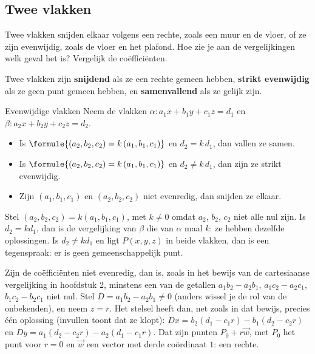 \subsection{Twee vlakken}

Twee vlakken snijden elkaar volgens een rechte, zoals een muur en de vloer, of ze zijn evenwijdig, zoals de vloer en het plafond. Hoe zie je aan de vergelijkingen welk geval het is? Vergelijk de coëfficiënten.

\begin{theorie}
Twee vlakken zijn \textbf{\textcolor{accent}{snijdend}} als ze een rechte gemeen hebben, \textbf{\textcolor{accent}{strikt evenwijdig}} als ze geen punt gemeen hebben, en \textbf{\textcolor{accent}{samenvallend}} als ze gelijk zijn.
\begin{stelling}{Evenwijdige vlakken}
Neem de vlakken $\alpha\colon a_1x + b_1y + c_1z = d_1$ en $\beta\colon a_2x + b_2y + c_2z = d_2$.
\begin{itemize}
\item Is $\formule{(a_2, b_2, c_2) = k\,(a_1, b_1, c_1)}$ en $d_2 = k\,d_1$, dan vallen ze samen.
\item Is $\formule{(a_2, b_2, c_2) = k\,(a_1, b_1, c_1)}$ en $d_2 \neq k\,d_1$, dan zijn ze strikt evenwijdig.
\item Zijn $(a_1, b_1, c_1)$ en $(a_2, b_2, c_2)$ niet evenredig, dan snijden ze elkaar.
\end{itemize}
\end{stelling}
\begin{bewijs}
Stel $(a_2, b_2, c_2) = k(a_1, b_1, c_1)$, met $k \neq 0$ omdat $a_2$, $b_2$, $c_2$ niet alle nul zijn. Is $d_2 = kd_1$, dan is de vergelijking van $\beta$ die van $\alpha$ maal $k$: ze hebben dezelfde oplossingen. Is $d_2 \neq kd_1$ en ligt $P(x, y, z)$ in beide vlakken, dan is
een tegenspraak: er is geen gemeenschappelijk punt.

Zijn de coëfficiënten niet evenredig, dan is, zoals in het bewijs van de cartesiaanse vergelijking in hoofdstuk 2, minstens een van de getallen $a_1b_2 - a_2b_1$, $a_1c_2 - a_2c_1$, $b_1c_2 - b_2c_1$ niet nul. Stel $D = a_1b_2 - a_2b_1 \neq 0$ (anders wissel je de rol van de onbekenden), en neem $z = r$. Het stelsel
heeft dan, net zoals in dat bewijs, precies één oplossing (invullen toont dat ze klopt): $Dx = b_2(d_1 - c_1r) - b_1(d_2 - c_2r)$ en $Dy = a_1(d_2 - c_2r) - a_2(d_1 - c_1r)$. Dat zijn punten $P_0 + r\vec w$, met $P_0$ het punt voor $r = 0$ en $\vec w$ een vector met derde coördinaat $1$: een rechte.
\end{bewijs}
\end{theorie}

